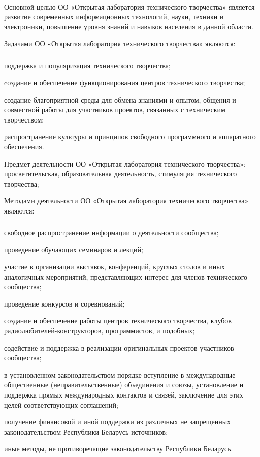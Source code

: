 \documentclass[a4paper,fontsize=14pt,titlepage]{scrartcl}
\makeatletter
\newenvironment{numberedpars}{%
  \addtocounter{secnumdepth}{1}
  \renewcommand\theparagraph{\arabic{section}.\arabic{paragraph}}
  \renewcommand\@seccntformat[1]
  {\expandafter\ifx\csname##1\endcsname\paragraph\csname 
  the##1\endcsname\else\csname the##1\endcsname\quad\fi}
  \let\old@par=\par
  \def\new@par{\let\par=\old@par\paragraph{}\let\par=\new@par}
  \let\par=\new@par
  \par
}{
  \addtocounter{secnumdepth}{-1}
}
\newenvironment{numberedsubpars}{%
  \addtocounter{secnumdepth}{1}
  \renewcommand\thesubparagraph{\arabic{section}.\arabic{paragraph}.\arabic{subparagraph}}
  \renewcommand\@seccntformat[1]
  {\expandafter\ifx\csname##1\endcsname\subparagraph\csname 
  the##1\endcsname\else\csname the##1\endcsname\quad\fi}
  \let\old@@par=\par
  \def\new@@par{\let\par=\old@par\subparagraph{}\let\par=\new@@par}
  \let\par=\new@@par
  \par
}{
  \addtocounter{secnumdepth}{-1}
  \let\par=\old@@par
}
\makeatother
\begin{document}
\begin{numberedpars}
Основной целью ОО «Открытая лаборатория технического творчества» является развитие современных информационных
технологий, науки, техники и электроники, повышение уровня знаний и навыков населения в данной области.

Задачами ОО «Открытая лаборатория технического творчества» являются:
\begin{numberedsubpars}
поддержка и популяризация технического творчества;

cоздание и обеспечение функционирования центров технического творчества;

создание благоприятной среды для обмена знаниями и опытом, общения и совместной работы для участников проектов,
связанных с техническим творчеством;

распространение культуры и принципов свободного программного и аппаратного обеспечения.
\end{numberedsubpars}

Предмет деятельности ОО «Открытая лаборатория технического творчества»: просветительская, образовательная деятельность,
стимуляция технического творчества;

Методами деятельности ОО «Открытая лаборатория технического творчества» являются:
\begin{numberedsubpars}
свободное распространение информации о деятельности сообщества;

проведение обучающих семинаров и лекций;

участие в организации выставок, конференций, круглых столов и иных аналогичных мероприятий, представляющих интерес для
членов технического сообщества;

проведение конкурсов и соревнований;

создание и обеспечение работы центров технического творчества, клубов радиолюбителей-конструкторов, программистов, и
подобных;

содействие и поддержка в реализации оригинальных проектов участников сообщества;

в установленном законодательством порядке вступление в международные общественные (неправительственные) объединения и
союзы, установление и поддержка прямых международных контактов и связей, заключение для этих целей соответствующих
соглашений;

получение финансовой и иной поддержки из различных не запрещенных законодательством Республики Беларусь источников;

иные методы, не противоречащие законодательству Республики Беларусь.
\end{numberedsubpars}
\end{numberedpars}
\end{document}
